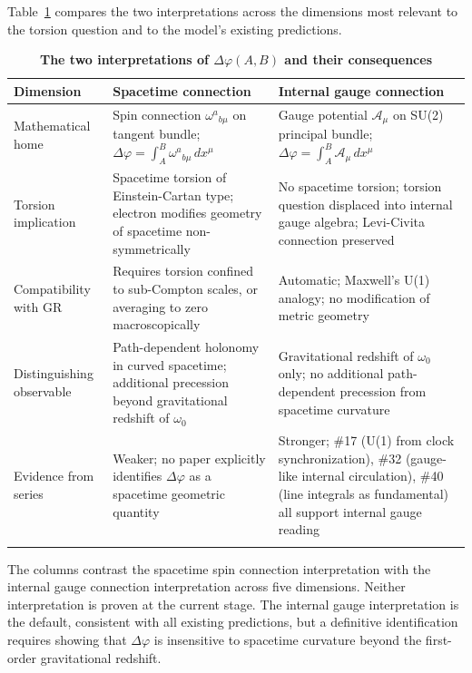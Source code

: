 \documentclass[%
 reprint,
 amsmath,amssymb,
 aps,
 prb,
]{revtex4-2}
\numberwithin{equation}{section}
\begin{document}
Table~\ref{tab:dichotomy} compares the two interpretations across the dimensions most relevant to the torsion question and to the model's existing predictions.

\begin{table}[t!]
\centering
\caption{\textbf{The two interpretations of $\Delta\varphi(A,B)$ and their consequences}}
\label{tab:dichotomy}
\renewcommand{\arraystretch}{1.5}
\setlength{\tabcolsep}{7pt}
\begin{tabular}{p{4.8cm}p{5.8cm}p{5.9cm}}
\toprule
\textbf{Dimension} & \textbf{Spacetime connection} & \textbf{Internal gauge connection} \\
\midrule
Mathematical home
& Spin connection $\omega^a{}_{b\mu}$ on tangent bundle; $\Delta\varphi = \int_A^B \omega^a{}_{b\mu}\,dx^\mu$
& Gauge potential $\mathcal{A}_\mu$ on SU(2) principal bundle; $\Delta\varphi = \int_A^B \mathcal{A}_\mu\,dx^\mu$ \\
\addlinespace[0.3cm]
Torsion implication
& Spacetime torsion of Einstein-Cartan type; electron modifies geometry of spacetime non-symmetrically
& No spacetime torsion; torsion question displaced into internal gauge algebra; Levi-Civita connection preserved \\
\addlinespace[0.3cm]
Compatibility with GR
& Requires torsion confined to sub-Compton scales, or averaging to zero macroscopically
& Automatic; Maxwell's U(1) analogy; no modification of metric geometry \\
\addlinespace[0.3cm]
Distinguishing observable
& Path-dependent holonomy in curved spacetime; additional precession beyond gravitational redshift of $\omega_0$
& Gravitational redshift of $\omega_0$ only; no additional path-dependent precession from spacetime curvature \\
\addlinespace[0.3cm]
Evidence from series
& Weaker; no paper explicitly identifies $\Delta\varphi$ as a spacetime geometric quantity
& Stronger; \#17 (U(1) from clock synchronization), \#32 (gauge-like internal circulation), \#40 (line integrals as fundamental) all support internal gauge reading \\
\addlinespace[0.2cm]
\bottomrule
\end{tabular}
\vspace{0.2cm}
\begin{minipage}{0.95\textwidth}
\justifying\footnotesize
The columns contrast the spacetime spin connection interpretation with the internal gauge connection interpretation across five dimensions. Neither interpretation is proven at the current stage. The internal gauge interpretation is the default, consistent with all existing predictions, but a definitive identification requires showing that $\Delta\varphi$ is insensitive to spacetime curvature beyond the first-order gravitational redshift.
\end{minipage}
\end{table}
\end{document}
